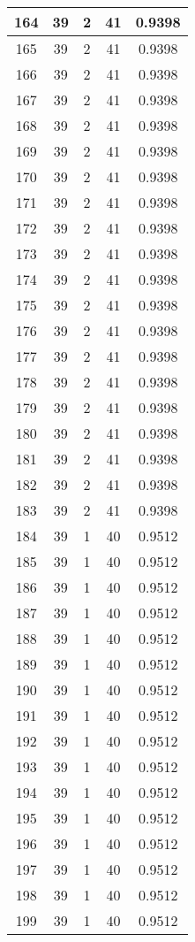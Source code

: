 \documentclass[letterpaper, 12pt]{article}
\begin{document}
\begin{longtable}{|c|c|c|c|c|}
\hline
164 & 39 & 2 & 41 & 0.9398 \\
\hline
165 & 39 & 2 & 41 & 0.9398 \\
\hline
166 & 39 & 2 & 41 & 0.9398 \\
\hline
167 & 39 & 2 & 41 & 0.9398 \\
\hline
168 & 39 & 2 & 41 & 0.9398 \\
\hline
169 & 39 & 2 & 41 & 0.9398 \\
\hline
170 & 39 & 2 & 41 & 0.9398 \\
\hline
171 & 39 & 2 & 41 & 0.9398 \\
\hline
172 & 39 & 2 & 41 & 0.9398 \\
\hline
173 & 39 & 2 & 41 & 0.9398 \\
\hline
174 & 39 & 2 & 41 & 0.9398 \\
\hline
175 & 39 & 2 & 41 & 0.9398 \\
\hline
176 & 39 & 2 & 41 & 0.9398 \\
\hline
177 & 39 & 2 & 41 & 0.9398 \\
\hline
178 & 39 & 2 & 41 & 0.9398 \\
\hline
179 & 39 & 2 & 41 & 0.9398 \\
\hline
180 & 39 & 2 & 41 & 0.9398 \\
\hline
181 & 39 & 2 & 41 & 0.9398 \\
\hline
182 & 39 & 2 & 41 & 0.9398 \\
\hline
183 & 39 & 2 & 41 & 0.9398 \\
\hline
184 & 39 & 1 & 40 & 0.9512 \\
\hline
185 & 39 & 1 & 40 & 0.9512 \\
\hline
186 & 39 & 1 & 40 & 0.9512 \\
\hline
187 & 39 & 1 & 40 & 0.9512 \\
\hline
188 & 39 & 1 & 40 & 0.9512 \\
\hline
189 & 39 & 1 & 40 & 0.9512 \\
\hline
190 & 39 & 1 & 40 & 0.9512 \\
\hline
191 & 39 & 1 & 40 & 0.9512 \\
\hline
192 & 39 & 1 & 40 & 0.9512 \\
\hline
193 & 39 & 1 & 40 & 0.9512 \\
\hline
194 & 39 & 1 & 40 & 0.9512 \\
\hline
195 & 39 & 1 & 40 & 0.9512 \\
\hline
196 & 39 & 1 & 40 & 0.9512 \\
\hline
197 & 39 & 1 & 40 & 0.9512 \\
\hline
198 & 39 & 1 & 40 & 0.9512 \\
\hline
199 & 39 & 1 & 40 & 0.9512 \\
\hline
\end{longtable}
\end{document}
